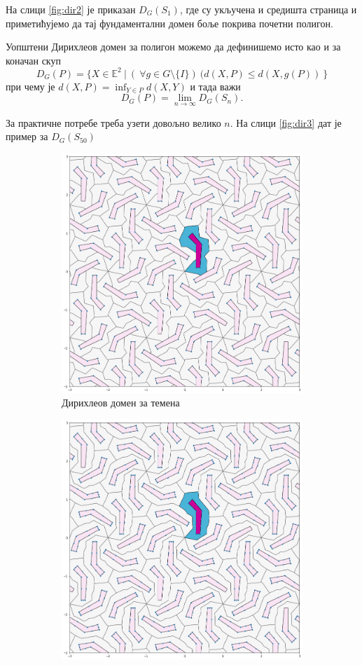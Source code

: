 \documentclass[12pt]{article}
\begin{document}
На слици \ref{fig:dir2} је приказан $D_G(S_1)$, где су укључена и средишта страница и приметићујемо да тај фундаментални домен боље покрива почетни полигон. 


Уопштени Дирихлеов домен за полигон можемо да дефинишемо исто као и за коначан скуп
$$D_G(P) = \{X \in \mathbb{E}^2\:|\:(\:\forall g \in G \setminus \{I\})\:(d(X,P)\leq d(X,g(P))\:\}$$
при чему је $d(X,P) = \inf_{Y \in P} d(X,Y)$  и тада важи
$$ D_G(P) = \lim _{n\to \infty} D_G(S_n). $$


За практичне потребе треба узети довољно велико $n$. На слици \ref{fig:dir3} дат је пример за $D_G(S_{50})$

  \begin{figure}[H]
  \begin{subfigure}[b]{0.32\textwidth}
    \includegraphics[width=.9\textwidth]{poligon1.png}
    \caption{Дирихлеов домен за \newline темена}
    \label{fig:dir1}
  \end{subfigure}
  \begin{subfigure}[b]{0.32\textwidth}
    \includegraphics[width=.9\textwidth]{poligon2.png}

\end{subfigure}
\end{figure}
\end{document}
